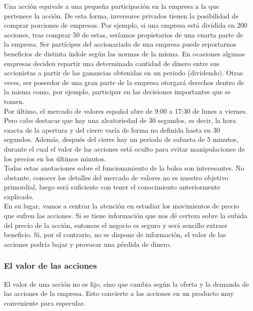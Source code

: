Una acci\'on equivale a una pequeña participaci\'on en la empresa a la que pertenece la acci\'on. De esta forma, inversores privados tienen la posibilidad de comprar porciones de empresas. Por ejemplo, si una empresa est\'a dividida en 200 acciones, tras comprar 50 de estas, ser\'iamos propietarios de una cuarta parte de la empresa. Ser part\'icipes del accionariado de una empresa puede reportarnos beneficios de distinta \'indole seg\'un las normas de la misma. En ocasiones algunas empresas deciden repartir una determinada cantidad de dinero entre sus accionistas a partir de las ganancias obtenidas en un periodo (dividendo). Otras veces, ser poseedor de una gran parte de la empresa otorgar\'a derechos dentro de la misma como, por ejemplo, participar en las decisiones importantes que se tomen.\\

Por \'ultimo, el mercado de valores espa\~nol abre de 9:00 a 17:30 de lunes a viernes. Pero cabe destacar que hay una aleatoriedad de 30 segundos, es decir, la hora exacta de la apertura y del cierre var\'ia de forma no definida hasta en 30 segundos. Además, despu\'es del cierre hay un periodo de subasta de 5 minutos, durante el cual el valor de las acciones est\'a oculto para evitar manipulaciones de los precios en los \'ultimos minutos. \\

Todas estas anotaciones sobre el funcionamiento de la bolsa son interesantes. No obstante, conocer los detalles del mercado de valores no es nuestro objetivo primordial, luego ser\'a suficiente con tener el conocimiento anteriormente explicado.\\

En su lugar, vamos a centrar la atenci\'on en estudiar los movimientos de precio que sufren las acciones. Si se tiene informaci\'on que nos d\'e certeza sobre la subida del precio de la acci\'on, entonces el negocio es seguro y ser\'a sencillo extraer beneficio. Si, por el contrario, no se dispone de informaci\'on, el valor de las acciones podr\'ia bajar y provocar una p\'erdida de dinero.\\

\subsubsection{El valor de las acciones}

El valor de una acci\'on no es fijo, sino que cambia seg\'un la oferta y la demanda de las acciones de la empresa. Esto convierte a las acciones en un producto muy conveniente para especular.\\

